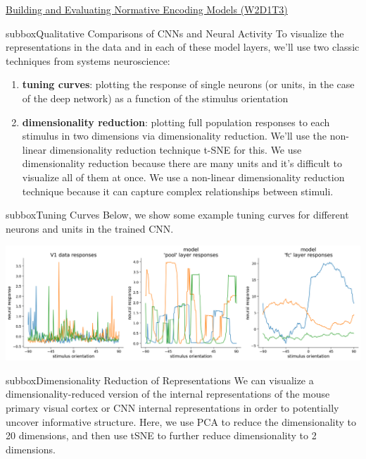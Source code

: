 \begin{textbox}{\href{https://compneuro.neuromatch.io/tutorials/W2D1_DeepLearning/student/W2D1_Tutorial3.html}{Building and Evaluating Normative Encoding Models (W2D1T3)} }
\begin{subbox}{subbox}{Qualitative Comparisons of CNNs and Neural Activity}
\scriptsize
To visualize the representations in the data and in each of these model layers, we'll use two classic techniques from systems neuroscience:
\begin{enumerate}
    \item 
 \textbf{tuning curves}: plotting the response of single neurons (or units, in the case of the deep network) as a function of the stimulus orientation

    \item  \textbf{dimensionality reduction}: plotting full population responses to each stimulus in two dimensions via dimensionality reduction. We'll use the non-linear dimensionality reduction technique t-SNE for this. We use dimensionality reduction because there are many units and it's difficult to visualize all of them at once. We use a non-linear dimensionality reduction technique because it can capture complex relationships between stimuli.
\end{enumerate}

\end{subbox}
\begin{subbox}{subbox}{Tuning Curves}
\scriptsize
Below, we show some example tuning curves for different neurons and units in the trained CNN.

\centering
\includegraphics[scale=0.15]{Figures/DL/DLFigure6.png}

\end{subbox}
\begin{subbox}{subbox}{Dimensionality Reduction of Representations}
\scriptsize
We can visualize a dimensionality-reduced version of the internal representations of the mouse primary visual cortex or CNN internal representations in order to potentially uncover informative structure. Here, we use PCA to reduce the dimensionality to 20 dimensions, and then use tSNE to further reduce dimensionality to 2 dimensions.


\end{subbox}
\end{textbox}
